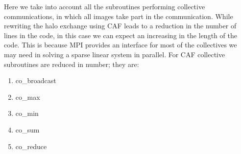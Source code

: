\documentclass{IOS-Book-Article}
\begin{document}
Here we take into account all the subroutines performing collective communications, in which all images take part in the communication. While rewriting the halo exchange using CAF leads to a reduction in the number of lines in the code, in this case we can expect an increasing in the length of the code. This is because MPI provides an interface for most of the collectives we may need in solving a sparse linear system in parallel. For CAF collective subroutines are reduced in number; they are:

\begin{enumerate}
\item co\_broadcast
\item co\_max
\item co\_min
\item co\_sum
\item co\_reduce
\end{enumerate}
\end{document}
